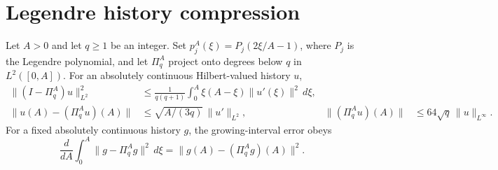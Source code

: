 \section{Legendre history compression}
\label{cp:legendre-section}

\begin{lemma}
\label{cp:projection}
Let $A>0$ and let $q\ge1$ be an integer. Set
$p_j^A(\xi)=P_j(2\xi/A-1)$, where $P_j$ is the Legendre
polynomial, and let $\Pi_q^A$ project onto degrees below $q$ in
$L^2([0,A])$.  For an absolutely continuous Hilbert-valued history $u$,
\begin{align}
 \|(I-\Pi_q^A)u\|_{L^2}^2
 &\le\frac1{q(q+1)}\int_0^A\xi(A-\xi)\|u'(\xi)\|^2\,d\xi,
 \label{cp:eq-projection-tail}\\
 \|u(A)-(\Pi_q^Au)(A)\|
 &\le\sqrt{A/(3q)}\,\|u'\|_{L^2},&
 \|(\Pi_q^Au)(A)\|&\le64\sqrt q\,\|u\|_{L^\infty}.
 \label{cp:eq-projection-endpoint}
\end{align}
For a fixed absolutely continuous history $g$, the growing-interval error obeys
\begin{equation}
 \frac d{dA}\int_0^A\|g-\Pi_q^Ag\|^2\,d\xi
       =\|g(A)-(\Pi_q^Ag)(A)\|^2.
 \label{cp:eq-projection-growth}
\end{equation}
\end{lemma}
